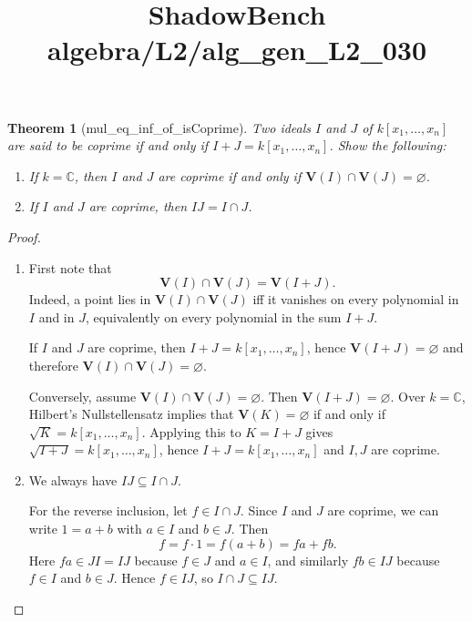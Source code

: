 \documentclass{article}
\title{ShadowBench algebra/L2/alg\_gen\_L2\_030}
\newtheorem{theorem}{Theorem}
\begin{document}
\maketitle

\begin{theorem}[mul_eq_inf_of_isCoprime]
Two ideals $I$ and $J$ of $k[x_1,\ldots,x_n]$ are said to be \emph{coprime} if and only if
$I+J = k[x_1,\ldots,x_n]$. Show the following:
\begin{enumerate}
  \item If $k=\mathbb C$, then $I$ and $J$ are coprime if and only if
  $\mathbf V(I)\cap \mathbf V(J)=\varnothing$.
  \item If $I$ and $J$ are coprime, then $IJ = I \cap J$.
\end{enumerate}
\end{theorem}

\begin{proof}
\begin{enumerate}
  \item First note that
  \[
    \mathbf V(I)\cap \mathbf V(J)=\mathbf V(I+J).
  \]
  Indeed, a point lies in $\mathbf V(I)\cap \mathbf V(J)$ iff it vanishes on every polynomial in $I$
  and in $J$, equivalently on every polynomial in the sum $I+J$.

  If $I$ and $J$ are coprime, then $I+J=k[x_1,\ldots,x_n]$, hence $\mathbf V(I+J)=\varnothing$ and
  therefore $\mathbf V(I)\cap \mathbf V(J)=\varnothing$.

  Conversely, assume $\mathbf V(I)\cap \mathbf V(J)=\varnothing$. Then $\mathbf V(I+J)=\varnothing$.
  Over $k=\mathbb C$, Hilbert's Nullstellensatz implies that $\mathbf V(K)=\varnothing$ if and only if
  $\sqrt{K}=k[x_1,\ldots,x_n]$. Applying this to $K=I+J$ gives $\sqrt{I+J}=k[x_1,\ldots,x_n]$, hence
  $I+J=k[x_1,\ldots,x_n]$ and $I,J$ are coprime.

  \item We always have $IJ\subseteq I\cap J$.

  For the reverse inclusion, let $f\in I\cap J$. Since $I$ and $J$ are coprime, we can write
  $1=a+b$ with $a\in I$ and $b\in J$. Then
  \[
    f=f\cdot 1=f(a+b)=fa+fb.
  \]
  Here $fa\in JI=IJ$ because $f\in J$ and $a\in I$, and similarly $fb\in IJ$ because $f\in I$ and
  $b\in J$. Hence $f\in IJ$, so $I\cap J\subseteq IJ$.
\end{enumerate}
\end{proof}
\end{document}
